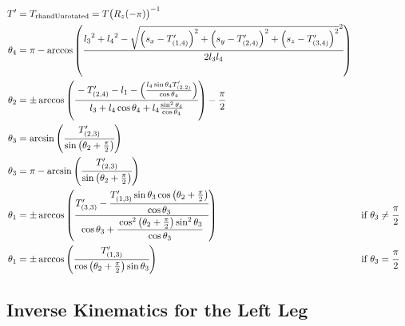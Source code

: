 \begin{align*}
T' &= T_\text{rhandUnrotated} = T{\big(R_z(-\pi)\big)}^{-1}\\
\theta_4 &= \pi - \arccos\left(\cfrac{{l_3}^2 + {l_4}^2 - \sqrt{\left(s_x-T'_{(1,4)}\right)^2 + \left(s_y-T'_{(2,4)}\right)^2 + \left(s_z-T'_{(3,4)}\right)^2}^2 }{2 l_3 l_4}\right)\\
\theta_2 &= \pm\arccos\left(\cfrac{ - T'_{(2,4)} - l_1 - \left(\frac{l_4\sin\theta_4T'_{(2,2)}}{\cos\theta_4} \right)}{l_3 +l_4\cos\theta_4 + l_4\frac{\sin^2\theta_4}{\cos\theta_4}}\right)-\frac{\pi}{2}\\
\theta_3 &= \arcsin\left(\cfrac{T'_{(2,3)}}{\sin\left(\theta_2 + \frac{\pi}{2}\right)}\right)\\
\theta_3 &= \pi - \arcsin\left(\cfrac{T'_{(2,3)}}{\sin\left(\theta_2 + \frac{\pi}{2}\right)}\right) \\
\theta_1 &= \pm\arccos\left(\cfrac{T'_{(3,3)} - \cfrac{T'_{(1,3)}\sin\theta_3\cos\left(\theta_2 + \frac{\pi}{2}\right)}{\cos\theta_3}}{\cos\theta_3 + \cfrac{\cos^2\left(\theta_2 + \frac{\pi}{2}\right)\sin^2\theta_3}{\cos\theta_3}}\right) &\text{if } \theta_3 \neq \cfrac{\pi}{2}& \\
\theta_1 &= \pm\arccos\left(\cfrac{T'_{(1,3)}}{\cos\left(\theta_2 +\frac{\pi}{2}\right)\sin\theta_3}\right) &\text{if } \theta_3 = \cfrac{\pi}{2}
\end{align*}





\subsection{Inverse Kinematics for the Left Leg}

